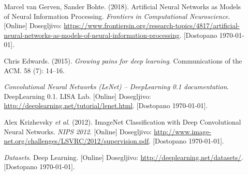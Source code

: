 \documentclass[a4paper,11pt]{article}
\begin{document}
\begin{thebibliography}{99}
 Marcel van Gerven, Sander Bohte. (2018). Artificial Neural Networks as Models of Neural Information Processing.
	\emph{Frontiers in Computational Neuroscience}. [Online] Dosegljivo:
	\url{https://www.frontiersin.org/research-topics/4817/artificial-neural-networks-as-models-of-neural-information-processing}.
	[Dostopano \today].

 Chris Edwards. (2015). \emph{Growing pains for deep learning}. Communications of the ACM. 58 (7): 14–16.

 \emph{Convolutional Neural Networks (LeNet) – DeepLearning 0.1 documentation}. DeepLearning 0.1. LISA Lab.
	[Online] Dosegljivo: \url{http://deeplearning.net/tutorial/lenet.html}. [Dostopano \today].

 Alex Krizhevsky \emph{et al}. (2012). ImageNet Classification with Deep Convolutional Neural Networks.
	\emph{NIPS 2012}. [Online] Dosegljivo: \url{http://www.image-net.org/challenges/LSVRC/2012/supervision.pdf}. [Dostopano \today].

 \emph{Datasets}. Deep Learning. [Online] Dosegljivo: \url{http://deeplearning.net/datasets/}. [Dostopano \today].

\end{thebibliography}
\end{document}
